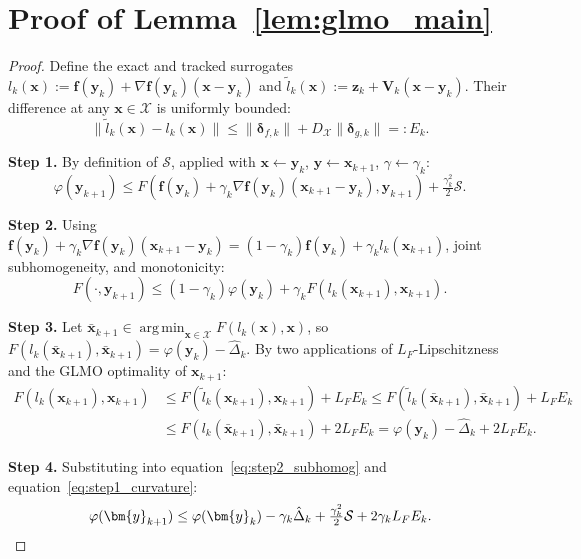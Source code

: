 \documentclass{article}
\def\eqref#1{equation~\ref{#1}}
\newcommand{\cX}{\mathcal{X}}
\def\vf{{\bm{f}}}
\def\vx{{\bm{x}}}
\def\vy{{\bm{y}}}
\def\vz{{\bm{z}}}
\def\mV{{\bm{V}}}
\DeclareMathOperator*{\argmin}{arg\,min}
\begin{document}
\section{Proof of Lemma~\ref{lem:glmo_main}} \label{sec:proof_glmo}

\begin{proof}
Define the exact and tracked surrogates $l_k(\vx) := \vf(\vy_k) + \nabla \vf(\vy_k)(\vx - \vy_k)$ and $\tilde l_k(\vx) := \vz_k + \mV_k(\vx - \vy_k)$. Their difference at any $\vx \in \cX$ is uniformly bounded:
\begin{equation} \label{eq:uniform_surrogate_bound}
\|\tilde l_k(\vx) - l_k(\vx)\| \le \|\bm{\delta}_{f,k}\| + D_{\cX} \|\bm{\delta}_{g,k}\| =: E_k.
\end{equation}

\textbf{Step 1.} By definition of $\mathcal{S}$, applied with $\vx \leftarrow \vy_k$, $\vy \leftarrow \vx_{k+1}$, $\gamma \leftarrow \gamma_k$:
\begin{equation} \label{eq:step1_curvature}
\varphi(\vy_{k+1}) \le F(\vf(\vy_k) + \gamma_k \nabla \vf(\vy_k)(\vx_{k+1} - \vy_k), \vy_{k+1}) + \tfrac{\gamma_k^2}{2} \mathcal{S}.
\end{equation}

\textbf{Step 2.} Using $\vf(\vy_k) + \gamma_k \nabla \vf(\vy_k)(\vx_{k+1} - \vy_k) = (1-\gamma_k)\vf(\vy_k) + \gamma_k l_k(\vx_{k+1})$, joint subhomogeneity, and monotonicity:
\begin{equation} \label{eq:step2_subhomog}
F(\cdot, \vy_{k+1}) \le (1 - \gamma_k) \varphi(\vy_k) + \gamma_k F(l_k(\vx_{k+1}), \vx_{k+1}).
\end{equation}

\textbf{Step 3.} Let $\bar \vx_{k+1} \in \argmin_{\vx \in \cX} F(l_k(\vx), \vx)$, so $F(l_k(\bar\vx_{k+1}), \bar\vx_{k+1}) = \varphi(\vy_k) - \hat\Delta_k$. By two applications of $L_F$-Lipschitzness and the GLMO optimality of $\vx_{k+1}$:
\begin{align*}
F(l_k(\vx_{k+1}), \vx_{k+1})
&\le F(\tilde l_k(\vx_{k+1}), \vx_{k+1}) + L_F E_k
\le F(\tilde l_k(\bar \vx_{k+1}), \bar \vx_{k+1}) + L_F E_k \\
&\le F(l_k(\bar \vx_{k+1}), \bar \vx_{k+1}) + 2 L_F E_k = \varphi(\vy_k) - \hat\Delta_k + 2 L_F E_k.
\end{align*}

\textbf{Step 4.} Substituting into \eqref{eq:step2_subhomog} and \eqref{eq:step1_curvature}:
\[
\varphi(\vy_{k+1}) \le \varphi(\vy_k) - \gamma_k \hat\Delta_k + \tfrac{\gamma_k^2}{2} \mathcal{S} + 2 \gamma_k L_F E_k. \qedhere
\]
\end{proof}
\end{document}
